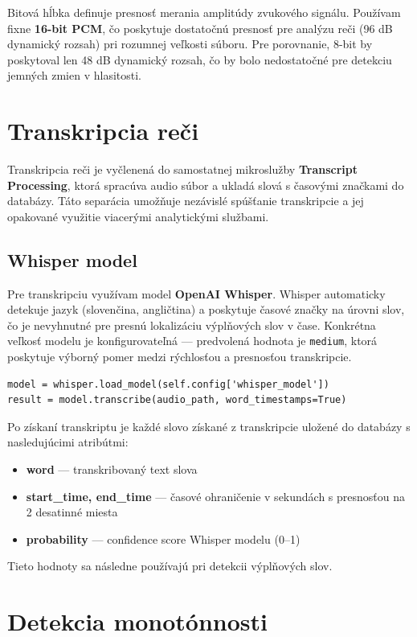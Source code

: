 Bitová hĺbka definuje presnosť merania amplitúdy zvukového signálu.
Používam fixne \textbf{16-bit PCM}, čo poskytuje dostatočnú presnosť pre analýzu reči (96 dB dynamický rozsah) pri rozumnej veľkosti súboru.
Pre porovnanie, 8-bit by poskytoval len 48 dB dynamický rozsah, čo by bolo nedostatočné pre detekciu jemných zmien v hlasitosti.

\section{Transkripcia reči}

Transkripcia reči je vyčlenená do samostatnej mikroslužby \textbf{Transcript Processing}, ktorá spracúva audio súbor a ukladá slová s časovými značkami do databázy. Táto separácia umožňuje nezávislé spúšťanie transkripcie a jej opakované využitie viacerými analytickými službami.

\subsection{Whisper model}

Pre transkripciu využívam model \textbf{OpenAI Whisper}\cite{whisper}. Whisper automaticky detekuje jazyk (slovenčina, angličtina) a poskytuje časové značky na úrovni slov, čo je nevyhnutné pre presnú lokalizáciu výplňových slov v čase.
Konkrétna veľkosť modelu je konfigurovateľná --- predvolená hodnota je \texttt{medium}, ktorá poskytuje výborný pomer medzi rýchlosťou a presnosťou transkripcie.

\begin{verbatim}
model = whisper.load_model(self.config['whisper_model'])
result = model.transcribe(audio_path, word_timestamps=True)
\end{verbatim}

Po získaní transkriptu je každé slovo získané z transkripcie uložené do databázy s nasledujúcimi atribútmi:
\begin{itemize}
    \item \textbf{word} --- transkribovaný text slova
    \item \textbf{start\_time, end\_time} --- časové ohraničenie v sekundách s presnosťou na 2 desatinné miesta
    \item \textbf{probability} --- confidence score Whisper modelu (0--1)
\end{itemize}

Tieto hodnoty sa následne používajú pri detekcii výplňových slov.

\section{Detekcia monotónnosti}

